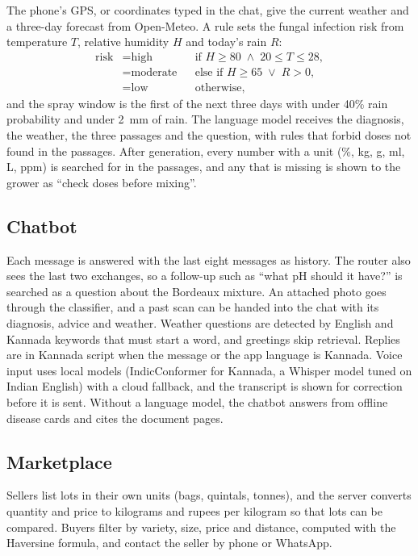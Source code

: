 The phone's GPS, or coordinates typed in the chat, give the current weather and a three-day forecast from Open-Meteo.
A rule sets the fungal infection risk from temperature $T$, relative humidity $H$ and today's rain $R$:
\begin{equation}
\begin{aligned}
\mathrm{risk} &= \text{high} && \text{if } H \ge 80 \;\land\; 20 \le T \le 28,\\
&= \text{moderate} && \text{else if } H \ge 65 \;\lor\; R > 0,\\
&= \text{low} && \text{otherwise},
\end{aligned}
\end{equation}
and the spray window is the first of the next three days with under 40\% rain probability and under 2~mm of rain. The
language model receives the diagnosis, the weather, the three passages and the question, with rules that forbid doses
not found in the passages. After generation, every number with a unit (\%, kg, g, ml, L, ppm) is searched for in the
passages, and any that is missing is shown to the grower as ``check doses before mixing''.

\subsection{Chatbot}
Each message is answered with the last eight messages as history. The router also sees the last two exchanges, so a
follow-up such as ``what pH should it have?'' is searched as a question about the Bordeaux mixture. An attached photo
goes through the classifier, and a past scan can be handed into the chat with its diagnosis, advice and weather.
Weather questions are detected by English and Kannada keywords that must start a word, and greetings skip retrieval.
Replies are in Kannada script when the message or the app language is Kannada. Voice input uses local models
(IndicConformer for Kannada, a Whisper model tuned on Indian English) with a cloud fallback, and the transcript is
shown for correction before it is sent. Without a language model, the chatbot answers from offline disease cards and
cites the document pages.

\subsection{Marketplace}
Sellers list lots in their own units (bags, quintals, tonnes), and the server converts quantity and price to kilograms
and rupees per kilogram so that lots can be compared. Buyers filter by variety, size, price and distance, computed with
the Haversine formula, and contact the seller by phone or WhatsApp.

